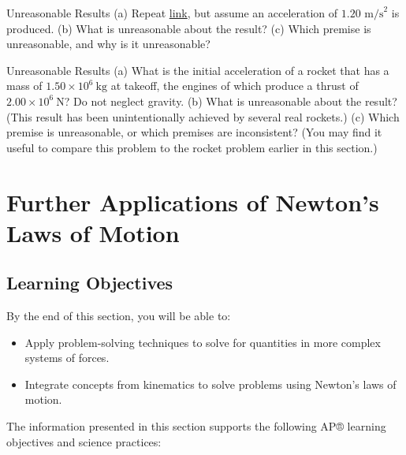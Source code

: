 \documentclass[
]{book}
\providecommand{\tightlist}{%
  \setlength{\itemsep}{0pt}\setlength{\parskip}{0pt}}
\begin{document}
\hypertarget{fs-id1325985}{}
\hypertarget{fs-id2731874}{}
{Unreasonable Results} (a) Repeat
\protect\hyperlink{fs-id1673888}{link}, but assume an
acceleration of \({1\text{.}\text{20\ m/s}^{2}}{}\) is produced. (b) What
is unreasonable about the result? (c) Which premise is unreasonable, and
why is it unreasonable?

\hypertarget{fs-id1285123}{}
\hypertarget{fs-id1782779}{}
{Unreasonable Results} (a) What is the initial
acceleration of a rocket that has a mass of
\({1\text{.}{\text{50} \times \text{10}^{6}}\ \text{kg}}{}\) at takeoff,
the engines of which produce a thrust of
\({2\text{.}{\text{00} \times \text{10}^{6}}\ \text{N}}{}\)? Do not
neglect gravity. (b) What is unreasonable about the result? (This result
has been unintentionally achieved by several real rockets.) (c) Which
premise is unreasonable, or which premises are inconsistent? (You may
find it useful to compare this problem to the rocket problem earlier in
this section.)

\hypertarget{further-applications-of-newtons-laws-of-motion}{%
\section{Further Applications of Newton's Laws of Motion}\label{further-applications-of-newtons-laws-of-motion}}

\hypertarget{fs-id2160702}{}
\hypertarget{learning-objectives-18}{%
\subsection{Learning Objectives}\label{learning-objectives-18}}

By the end of this section, you will be able to:

\begin{itemize}
\tightlist
\item
  Apply problem-solving techniques to solve for quantities in more
  complex systems of forces.
\item
  Integrate concepts from kinematics to solve problems using Newton's
  laws of motion.
\end{itemize}

The information presented in this section supports the following AP®
learning objectives and science practices:
\end{document}
